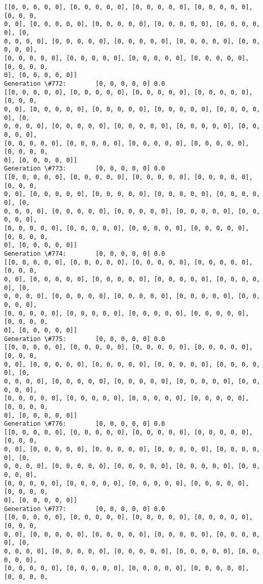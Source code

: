 \documentclass[11pt]{article}
\begin{document}
\begin{Verbatim}[commandchars=\\\{\}]
[[0, 0, 0, 0, 0], [0, 0, 0, 0, 0], [0, 0, 0, 0, 0], [0, 0, 0, 0, 0], [0, 0, 0,
0, 0], [0, 0, 0, 0, 0], [0, 0, 0, 0, 0], [0, 0, 0, 0, 0], [0, 0, 0, 0, 0], [0,
0, 0, 0, 0], [0, 0, 0, 0, 0], [0, 0, 0, 0, 0], [0, 0, 0, 0, 0], [0, 0, 0, 0, 0],
[0, 0, 0, 0, 0], [0, 0, 0, 0, 0], [0, 0, 0, 0, 0], [0, 0, 0, 0, 0], [0, 0, 0, 0,
0], [0, 0, 0, 0, 0]]
Generation \#772:        [0, 0, 0, 0, 0] 0.0
[[0, 0, 0, 0, 0], [0, 0, 0, 0, 0], [0, 0, 0, 0, 0], [0, 0, 0, 0, 0], [0, 0, 0,
0, 0], [0, 0, 0, 0, 0], [0, 0, 0, 0, 0], [0, 0, 0, 0, 0], [0, 0, 0, 0, 0], [0,
0, 0, 0, 0], [0, 0, 0, 0, 0], [0, 0, 0, 0, 0], [0, 0, 0, 0, 0], [0, 0, 0, 0, 0],
[0, 0, 0, 0, 0], [0, 0, 0, 0, 0], [0, 0, 0, 0, 0], [0, 0, 0, 0, 0], [0, 0, 0, 0,
0], [0, 0, 0, 0, 0]]
Generation \#773:        [0, 0, 0, 0, 0] 0.0
[[0, 0, 0, 0, 0], [0, 0, 0, 0, 0], [0, 0, 0, 0, 0], [0, 0, 0, 0, 0], [0, 0, 0,
0, 0], [0, 0, 0, 0, 0], [0, 0, 0, 0, 0], [0, 0, 0, 0, 0], [0, 0, 0, 0, 0], [0,
0, 0, 0, 0], [0, 0, 0, 0, 0], [0, 0, 0, 0, 0], [0, 0, 0, 0, 0], [0, 0, 0, 0, 0],
[0, 0, 0, 0, 0], [0, 0, 0, 0, 0], [0, 0, 0, 0, 0], [0, 0, 0, 0, 0], [0, 0, 0, 0,
0], [0, 0, 0, 0, 0]]
Generation \#774:        [0, 0, 0, 0, 0] 0.0
[[0, 0, 0, 0, 0], [0, 0, 0, 0, 0], [0, 0, 0, 0, 0], [0, 0, 0, 0, 0], [0, 0, 0,
0, 0], [0, 0, 0, 0, 0], [0, 0, 0, 0, 0], [0, 0, 0, 0, 0], [0, 0, 0, 0, 0], [0,
0, 0, 0, 0], [0, 0, 0, 0, 0], [0, 0, 0, 0, 0], [0, 0, 0, 0, 0], [0, 0, 0, 0, 0],
[0, 0, 0, 0, 0], [0, 0, 0, 0, 0], [0, 0, 0, 0, 0], [0, 0, 0, 0, 0], [0, 0, 0, 0,
0], [0, 0, 0, 0, 0]]
Generation \#775:        [0, 0, 0, 0, 0] 0.0
[[0, 0, 0, 0, 0], [0, 0, 0, 0, 0], [0, 0, 0, 0, 0], [0, 0, 0, 0, 0], [0, 0, 0,
0, 0], [0, 0, 0, 0, 0], [0, 0, 0, 0, 0], [0, 0, 0, 0, 0], [0, 0, 0, 0, 0], [0,
0, 0, 0, 0], [0, 0, 0, 0, 0], [0, 0, 0, 0, 0], [0, 0, 0, 0, 0], [0, 0, 0, 0, 0],
[0, 0, 0, 0, 0], [0, 0, 0, 0, 0], [0, 0, 0, 0, 0], [0, 0, 0, 0, 0], [0, 0, 0, 0,
0], [0, 0, 0, 0, 0]]
Generation \#776:        [0, 0, 0, 0, 0] 0.0
[[0, 0, 0, 0, 0], [0, 0, 0, 0, 0], [0, 0, 0, 0, 0], [0, 0, 0, 0, 0], [0, 0, 0,
0, 0], [0, 0, 0, 0, 0], [0, 0, 0, 0, 0], [0, 0, 0, 0, 0], [0, 0, 0, 0, 0], [0,
0, 0, 0, 0], [0, 0, 0, 0, 0], [0, 0, 0, 0, 0], [0, 0, 0, 0, 0], [0, 0, 0, 0, 0],
[0, 0, 0, 0, 0], [0, 0, 0, 0, 0], [0, 0, 0, 0, 0], [0, 0, 0, 0, 0], [0, 0, 0, 0,
0], [0, 0, 0, 0, 0]]
Generation \#777:        [0, 0, 0, 0, 0] 0.0
[[0, 0, 0, 0, 0], [0, 0, 0, 0, 0], [0, 0, 0, 0, 0], [0, 0, 0, 0, 0], [0, 0, 0,
0, 0], [0, 0, 0, 0, 0], [0, 0, 0, 0, 0], [0, 0, 0, 0, 0], [0, 0, 0, 0, 0], [0,
0, 0, 0, 0], [0, 0, 0, 0, 0], [0, 0, 0, 0, 0], [0, 0, 0, 0, 0], [0, 0, 0, 0, 0],
[0, 0, 0, 0, 0], [0, 0, 0, 0, 0], [0, 0, 0, 0, 0], [0, 0, 0, 0, 0], [0, 0, 0, 0,

\end{Verbatim}
\end{document}
